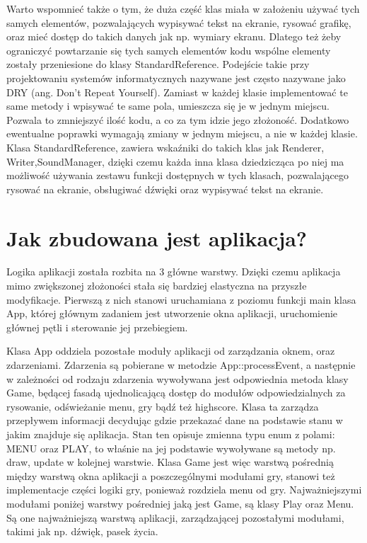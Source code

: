 Warto wspomnieć także o tym, że duża część klas miała w założeniu używać tych samych elementów, pozwalających wypisywać tekst na ekranie, rysować grafikę, oraz mieć dostęp do takich danych jak np. wymiary ekranu. Dlatego też żeby ograniczyć powtarzanie się tych samych elementów kodu wspólne elementy zostały przeniesione do klasy StandardReference. Podejście takie przy projektowaniu systemów informatycznych nazywane jest często nazywane jako DRY (ang. Don't Repeat Yourself). Zamiast w każdej klasie implementować te same metody i wpisywać te same pola, umieszcza się je w jednym miejscu. Pozwala to zmniejszyć ilość kodu, a co za tym idzie jego złożoność. Dodatkowo ewentualne poprawki wymagają zmiany w jednym miejscu, a nie w każdej klasie. Klasa StandardReference, zawiera wskaźniki do takich klas jak Renderer, Writer,SoundManager, dzięki czemu każda inna klasa dziedzicząca po niej ma możliwość używania zestawu funkcji dostępnych w tych klasach, pozwalającego rysować na ekranie, obsługiwać dźwięki oraz wypisywać tekst na ekranie.

\section{Jak zbudowana jest aplikacja?}

Logika aplikacji została rozbita na 3 główne warstwy. Dzięki czemu aplikacja mimo zwiększonej złożoności stała się bardziej elastyczna na przyszłe modyfikacje.  Pierwszą z nich stanowi uruchamiana z poziomu funkcji main klasa App, której głównym zadaniem jest utworzenie okna aplikacji, uruchomienie głównej pętli i sterowanie jej przebiegiem.

Klasa App oddziela pozostałe moduły aplikacji od zarządzania oknem, oraz zdarzeniami. Zdarzenia są pobierane w metodzie App::processEvent, a następnie w zależności od rodzaju zdarzenia wywoływana jest odpowiednia metoda klasy Game, będącej fasadą ujednolicającą dostęp do modułów odpowiedzialnych za rysowanie, odświeżanie menu, gry bądź też highscore. Klasa ta zarządza przepływem informacji decydując gdzie przekazać dane na podstawie stanu w jakim znajduje się aplikacja. Stan ten opisuje zmienna typu enum z polami: MENU oraz PLAY, to właśnie na jej podstawie wywoływane są metody np. draw, update w kolejnej warstwie. Klasa Game jest więc warstwą pośrednią między warstwą okna aplikacji a poszczególnymi modułami gry, stanowi też implementacje części logiki gry, ponieważ rozdziela menu od gry. Najważniejszymi modułami poniżej warstwy pośredniej jaką jest Game, są klasy Play oraz Menu. Są one najważniejszą warstwą aplikacji, zarządzającej pozostałymi modułami, takimi jak np. dźwięk, pasek życia.

